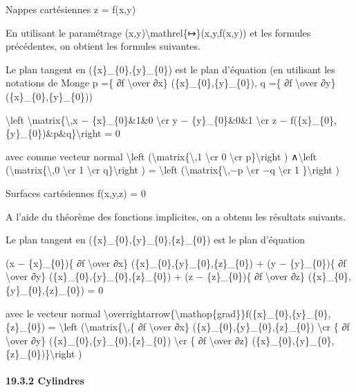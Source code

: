 \documentclass[]{article}
\begin{document}
Nappes cartésiennes z = f(x,y)

En utilisant le paramétrage
(x,y)\textbackslash{}mathrel\{↦\}(x,y,f(x,y)) et les formules
précédentes, on obtient les formules suivantes.

Le plan tangent en (\{x\}\_\{0\},\{y\}\_\{0\}) est le plan d'équation
(en utilisant les notations de Monge p =\{ ∂f \textbackslash{}over ∂x\}
(\{x\}\_\{0\},\{y\}\_\{0\}), q =\{ ∂f \textbackslash{}over ∂y\}
(\{x\}\_\{0\},\{y\}\_\{0\}))

\textbackslash{}left
\textbar{}\textbackslash{}matrix\{\textbackslash{},x −
\{x\}\_\{0\}\&1\&0 \textbackslash{}cr y − \{y\}\_\{0\}\&0\&1
\textbackslash{}cr z −
f(\{x\}\_\{0\},\{y\}\_\{0\})\&p\&q\}\textbackslash{}right \textbar{} = 0

avec comme vecteur normal \textbackslash{}left
(\textbackslash{}matrix\{\textbackslash{},1 \textbackslash{}cr 0
\textbackslash{}cr p\}\textbackslash{}right ) ∧\textbackslash{}left
(\textbackslash{}matrix\{\textbackslash{},0 \textbackslash{}cr 1
\textbackslash{}cr q\}\textbackslash{}right ) = \textbackslash{}left
(\textbackslash{}matrix\{\textbackslash{},−p \textbackslash{}cr −q
\textbackslash{}cr 1 \}\textbackslash{}right )

Surfaces cartésiennes f(x,y,z) = 0

A l'aide du théorème des fonctions implicites, on a obtenu les résultats
suivants.

Le plan tangent en (\{x\}\_\{0\},\{y\}\_\{0\},\{z\}\_\{0\}) est le plan
d'équation

(x − \{x\}\_\{0\})\{ ∂f \textbackslash{}over ∂x\}
(\{x\}\_\{0\},\{y\}\_\{0\},\{z\}\_\{0\}) + (y − \{y\}\_\{0\})\{ ∂f
\textbackslash{}over ∂y\} (\{x\}\_\{0\},\{y\}\_\{0\},\{z\}\_\{0\}) + (z
− \{z\}\_\{0\})\{ ∂f \textbackslash{}over ∂z\}
(\{x\}\_\{0\},\{y\}\_\{0\},\{z\}\_\{0\}) = 0

avec le vecteur normal
\textbackslash{}overrightarrow\{\textbackslash{}mathop\{grad\}\}f(\{x\}\_\{0\},\{y\}\_\{0\},\{z\}\_\{0\})
= \textbackslash{}left (\textbackslash{}matrix\{\textbackslash{},\{ ∂f
\textbackslash{}over ∂x\} (\{x\}\_\{0\},\{y\}\_\{0\},\{z\}\_\{0\})
\textbackslash{}cr \{ ∂f \textbackslash{}over ∂y\}
(\{x\}\_\{0\},\{y\}\_\{0\},\{z\}\_\{0\}) \textbackslash{}cr \{ ∂f
\textbackslash{}over ∂z\}
(\{x\}\_\{0\},\{y\}\_\{0\},\{z\}\_\{0\})\}\textbackslash{}right )

\paragraph{19.3.2 Cylindres}
\end{document}
